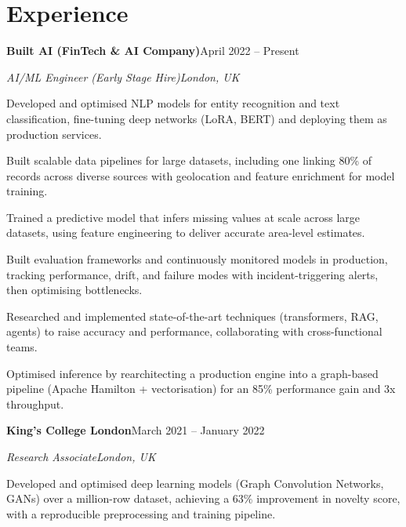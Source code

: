 \documentclass[10pt,a4paper]{article}
\newcommand{\entry}[4]{%
  {\color{company}\bfseries #1}\hfill {\color{muted}#2}\par
  \vspace{1pt}
  {\itshape #3}\hfill {\color{muted}\itshape #4}\par
  \vspace{3pt}%
}
\begin{document}
\section{Experience}
\entry{Built AI (FinTech \& AI Company)}{April 2022 -- Present}{AI/ML Engineer (Early Stage Hire)}{London, UK}
\begin{tight}
  \item Developed and optimised NLP models for entity recognition and text classification, fine-tuning deep networks (LoRA, BERT) and deploying them as production services.
  \item Built scalable data pipelines for large datasets, including one linking 80\% of records across diverse sources with geolocation and feature enrichment for model training.
  \item Trained a predictive model that infers missing values at scale across large datasets, using feature engineering to deliver accurate area-level estimates.
  \item Built evaluation frameworks and continuously monitored models in production, tracking performance, drift, and failure modes with incident-triggering alerts, then optimising bottlenecks.
  \item Researched and implemented state-of-the-art techniques (transformers, RAG, agents) to raise accuracy and performance, collaborating with cross-functional teams.
  \item Optimised inference by rearchitecting a production engine into a graph-based pipeline (Apache Hamilton + vectorisation) for an 85\% performance gain and 3x throughput.
\end{tight}

\entry{King's College London}{March 2021 -- January 2022}{Research Associate}{London, UK}
\begin{tight}
  \item Developed and optimised deep learning models (Graph Convolution Networks, GANs) over a million-row dataset, achieving a 63\% improvement in novelty score, with a reproducible preprocessing and training pipeline.
\end{tight}

\end{document}
